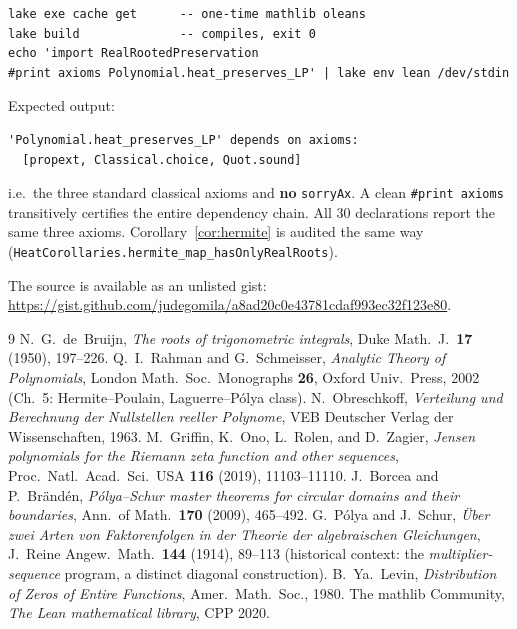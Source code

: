 \documentclass[11pt]{article}
\theoremstyle{definition}
\theoremstyle{remark}
\begin{document}
\begin{lstlisting}
lake exe cache get      -- one-time mathlib oleans
lake build              -- compiles, exit 0
echo 'import RealRootedPreservation
#print axioms Polynomial.heat_preserves_LP' | lake env lean /dev/stdin
\end{lstlisting}

Expected output:
\begin{lstlisting}
'Polynomial.heat_preserves_LP' depends on axioms:
  [propext, Classical.choice, Quot.sound]
\end{lstlisting}

i.e.\ the three standard classical axioms and \textbf{no} \texttt{sorryAx}. A clean
\texttt{\#print axioms} transitively certifies the entire dependency chain. All 30 declarations report
the same three axioms. Corollary~\ref{cor:hermite} is audited the same way
(\texttt{HeatCorollaries.hermite\_map\_hasOnlyRealRoots}).

The source is available as an unlisted gist:
\url{https://gist.github.com/judegomila/a8ad20c0e43781cdaf993ec32f123e80}.

\begin{thebibliography}{9}
 N.~G.~de~Bruijn, \emph{The roots of trigonometric integrals}, Duke Math.\ J.\
\textbf{17} (1950), 197--226.
 Q.~I.~Rahman and G.~Schmeisser, \emph{Analytic Theory of Polynomials},
London Math.\ Soc.\ Monographs \textbf{26}, Oxford Univ.\ Press, 2002 (Ch.~5: Hermite--Poulain,
Laguerre--P\'olya class).
 N.~Obreschkoff, \emph{Verteilung und Berechnung der Nullstellen reeller
Polynome}, VEB Deutscher Verlag der Wissenschaften, 1963.
 M.~Griffin, K.~Ono, L.~Rolen, and D.~Zagier, \emph{Jensen polynomials for the Riemann
zeta function and other sequences}, Proc.\ Natl.\ Acad.\ Sci.\ USA \textbf{116} (2019), 11103--11110.
\bibitem{borcea-branden} J.~Borcea and P.~Br\"and\'en, \emph{P\'olya--Schur master theorems for
circular domains and their boundaries}, Ann.\ of Math.\ \textbf{170} (2009), 465--492.
\bibitem{polya-schur} G.~P\'olya and J.~Schur, \emph{\"Uber zwei Arten von Faktorenfolgen in der
Theorie der algebraischen Gleichungen}, J.~Reine Angew.\ Math.\ \textbf{144} (1914), 89--113
(historical context: the \emph{multiplier-sequence} program, a distinct diagonal construction).
\bibitem{levin} B.~Ya.~Levin, \emph{Distribution of Zeros of Entire Functions}, Amer.\ Math.\ Soc.,
1980.
 The mathlib Community, \emph{The Lean mathematical library}, CPP 2020.
\end{thebibliography}
\end{document}
